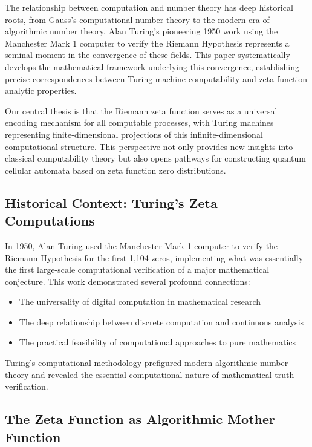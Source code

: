 \documentclass[12pt]{article}
\theoremstyle{plain}
\theoremstyle{definition}
\begin{document}
The relationship between computation and number theory has deep historical roots, from Gauss's computational number theory to the modern era of algorithmic number theory. Alan Turing's pioneering 1950 work using the Manchester Mark 1 computer to verify the Riemann Hypothesis represents a seminal moment in the convergence of these fields. This paper systematically develops the mathematical framework underlying this convergence, establishing precise correspondences between Turing machine computability and zeta function analytic properties.

Our central thesis is that the Riemann zeta function serves as a universal encoding mechanism for all computable processes, with Turing machines representing finite-dimensional projections of this infinite-dimensional computational structure. This perspective not only provides new insights into classical computability theory but also opens pathways for constructing quantum cellular automata based on zeta function zero distributions.

\subsection{Historical Context: Turing's Zeta Computations}

In 1950, Alan Turing used the Manchester Mark 1 computer to verify the Riemann Hypothesis for the first 1,104 zeros, implementing what was essentially the first large-scale computational verification of a major mathematical conjecture. This work demonstrated several profound connections:

\begin{itemize}
\item The universality of digital computation in mathematical research
\item The deep relationship between discrete computation and continuous analysis
\item The practical feasibility of computational approaches to pure mathematics
\end{itemize}

Turing's computational methodology prefigured modern algorithmic number theory and revealed the essential computational nature of mathematical truth verification.

\subsection{The Zeta Function as Algorithmic Mother Function}
\end{document}
